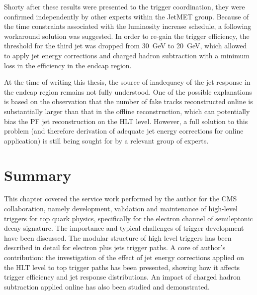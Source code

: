Shorty after these results were presented to the trigger coordination, they were confirmed independently by other
experts within the JetMET group. Because of the time constraints associated with the luminosity increase schedule, a
following workaround solution was suggested. In order to re-gain the trigger efficiency, the threshold for the third jet
was dropped from \SI{30}{\GeV} to \SI{20}{\GeV}, which allowed to apply jet energy corrections and charged hadron
subtraction with a minimum loss in the efficiency in the endcap region.

At the time of writing this thesis, the source of inadequacy of the jet response in the endcap region remains not fully
understood. One of the possible explanations is based on the observation that the number of fake tracks reconstructed
online is substantially larger than that in the offline reconstruction, which can potentially bias the PF jet
reconstruction on the HLT level. However, a full solution to this problem (and therefore derivation of adequate jet
energy corrections for online application) is still being sought for by a relevant group of experts.

\newpage
\section{Summary}
This chapter covered the service work performed by the author for the CMS collaboration, namely development, validation
and maintenance of high-level triggers for top quark physics, specifically for the electron channel of semileptonic
\ttbar decay signature. The importance and typical challenges of trigger development have been discussed. The modular
structure of high level triggers has been described in detail for electron plus jets trigger paths. A core of author's
contribution: the investigation of the effect of jet energy corrections applied on the HLT level to top trigger paths
has been presented, showing how it affects trigger efficiency and jet response distributions. An impact of charged
hadron subtraction applied online has also been studied and demonstrated.



